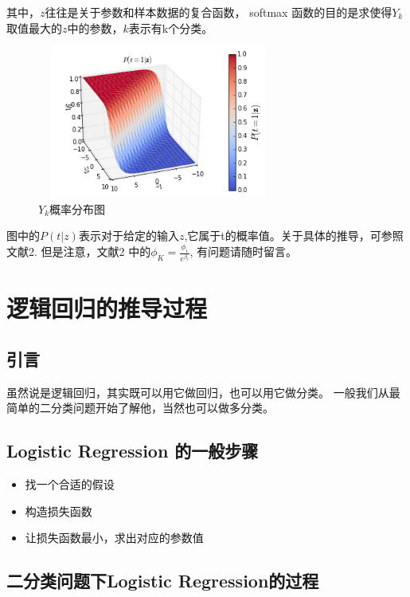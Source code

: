 \documentclass[a4paper,12pt]{book}
\begin{document}
    其中，$z$往往是关于参数和样本数据的复合函数，
    softmax 函数的目的是求使得$Y_k $取值最大的$z$中的参数，$k$表示有k个分类。
    \begin{figure}[h]
        \begin{center}
            \includegraphics[width=8cm, height=5cm]{7_2.jpg}
            \caption{$Y_k$概率分布图}
        \end{center}
    \end{figure}

    图中的$P(t|z)$表示对于给定的输入$z$,它属于t的概率值。关于具体的推导，可参照文献2. 但是注意，文献2 中的$\phi_K = \frac{\phi_i}{e^{\beta_i}}$, 有问题请随时留言。
    
    \section{逻辑回归的推导过程}
    \subsection{引言}
        虽然说是逻辑回归，其实既可以用它做回归，也可以用它做分类。
        一般我们从最简单的二分类问题开始了解他，当然也可以做多分类。

    \subsection{Logistic Regression 的一般步骤}
    \begin{itemize}
        \item 找一个合适的假设
        \item 构造损失函数
        \item 让损失函数最小，求出对应的参数值
    \end{itemize}


    \subsection{二分类问题下Logistic Regression的过程}
\end{document}
